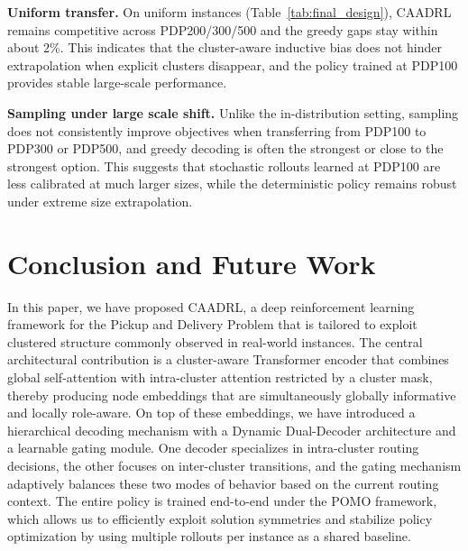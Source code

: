 \documentclass[pdflatex,sn-basic,Numbered]{sn-jnl}
\begin{document}
\textbf{Uniform transfer.}
On uniform instances (Table~\ref{tab:final_design}), CAADRL remains competitive across PDP200/300/500 and the greedy gaps stay within about $2\%$. This indicates that the cluster-aware inductive bias does not hinder extrapolation when explicit clusters disappear, and the policy trained at PDP100 provides stable large-scale performance.

\textbf{Sampling under large scale shift.}
Unlike the in-distribution setting, sampling does not consistently improve objectives when transferring from PDP100 to PDP300 or PDP500, and greedy decoding is often the strongest or close to the strongest option. This suggests that stochastic rollouts learned at PDP100 are less calibrated at much larger sizes, while the deterministic policy remains robust under extreme size extrapolation.


\section{Conclusion and Future Work}\label{sec:conclusion}

In this paper, we have proposed CAADRL, a deep reinforcement learning framework for the Pickup and Delivery Problem that is tailored to exploit clustered structure commonly observed in real-world instances. The central architectural contribution is a cluster-aware Transformer encoder that combines global self-attention with intra-cluster attention restricted by a cluster mask, thereby producing node embeddings that are simultaneously globally informative and locally role-aware. On top of these embeddings, we have introduced a hierarchical decoding mechanism with a Dynamic Dual-Decoder architecture and a learnable gating module. One decoder specializes in intra-cluster routing decisions, the other focuses on inter-cluster transitions, and the gating mechanism adaptively balances these two modes of behavior based on the current routing context. The entire policy is trained end-to-end under the POMO framework, which allows us to efficiently exploit solution symmetries and stabilize policy optimization by using multiple rollouts per instance as a shared baseline.
\end{document}
